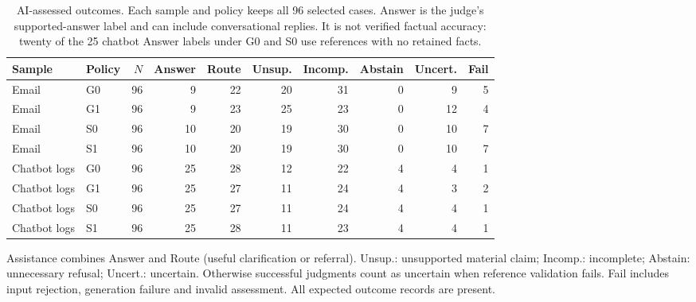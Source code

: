 \begin{table}[t]
\centering\small
\setlength{\tabcolsep}{5pt}
\caption{AI-assessed outcomes. Each sample and policy keeps all 96 selected cases. Answer is the judge's supported-answer label and can include conversational replies. It is not verified factual accuracy: twenty of the 25 chatbot Answer labels under G0 and S0 use references with no retained facts.}
\label{tab:luna-outcomes}
\begin{tabular}{llrrrrrrrr}
\toprule
Sample & Policy & $N$ & Answer & Route & Unsup. & Incomp. & Abstain & Uncert. & Fail \\
\midrule
Email & G0 & 96 & 9 & 22 & 20 & 31 & 0 & 9 & 5 \\
Email & G1 & 96 & 9 & 23 & 25 & 23 & 0 & 12 & 4 \\
Email & S0 & 96 & 10 & 20 & 19 & 30 & 0 & 10 & 7 \\
Email & S1 & 96 & 10 & 20 & 19 & 30 & 0 & 10 & 7 \\
Chatbot logs & G0 & 96 & 25 & 28 & 12 & 22 & 4 & 4 & 1 \\
Chatbot logs & G1 & 96 & 25 & 27 & 11 & 24 & 4 & 3 & 2 \\
Chatbot logs & S0 & 96 & 25 & 27 & 11 & 24 & 4 & 4 & 1 \\
Chatbot logs & S1 & 96 & 25 & 28 & 11 & 23 & 4 & 4 & 1 \\
\bottomrule
\end{tabular}
\par\smallskip\begin{minipage}{0.94\textwidth}\footnotesize Assistance combines Answer and Route (useful clarification or referral). Unsup.: unsupported material claim; Incomp.: incomplete; Abstain: unnecessary refusal; Uncert.: uncertain. Otherwise successful judgments count as uncertain when reference validation fails. Fail includes input rejection, generation failure and invalid assessment. All expected outcome records are present.\end{minipage}
\end{table}
